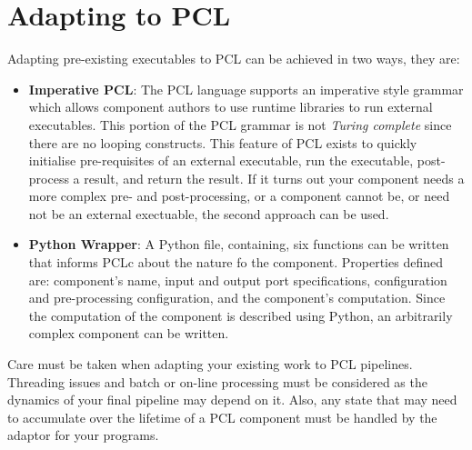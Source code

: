 \chapter{Adapting to PCL}
Adapting pre-existing executables to PCL can be achieved in two ways, they are:
\begin{itemize}
\item \textbf{Imperative PCL}: The PCL language supports an imperative style grammar which allows component authors to use runtime libraries to run external executables. This portion of the PCL grammar is not \emph{Turing complete} since there are no looping constructs. This feature of PCL exists to quickly initialise pre-requisites of an external executable, run the executable, post-process a result, and return the result. If it turns out your component needs a more complex pre- and post-processing, or a component cannot be, or need not be an external exectuable, the second approach can be used.
\item \textbf{Python Wrapper}: A Python file, containing, six functions can be written that informs PCLc about the nature fo the component. Properties defined are: component's name, input and output port specifications, configuration and pre-processing configuration, and the component's computation. Since the computation of the component is described using Python, an arbitrarily complex component can be written.
\end{itemize}

Care must be taken when adapting your existing work to PCL pipelines. Threading issues and batch or on-line processing must be considered as the dynamics of your final pipeline may depend on it. Also, any state that may need to accumulate over the lifetime of a PCL component must be handled by the adaptor for your programs.

